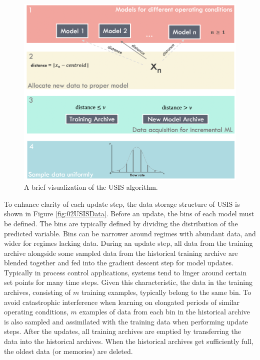 \begin{figure}
    \centering
    \includegraphics[width=\textwidth]{images/suncor/08IncrementalLearning.png}
    \caption{A brief visualization of the USIS algorithm.}
    \label{fig:02USIS}
\end{figure}

To enhance clarity of each update step, the data storage structure of USIS is shown in Figure \ref{fig:02USISData}. Before an update, the bins of each model must be defined.  The bins are typically defined by dividing the distribution of the predicted variable.  Bins can be narrower around regimes with abundant data, and wider for regimes lacking data.  During an update step, all data from the training archive alongside some sampled data from the historical training archive are blended together and fed into the gradient descent step for model updates.  Typically in process control applications, systems tend to linger around certain set points for many time steps.  Given this characteristic, the data in the training archives, consisting of $m$ training examples, typically belong to the same bin.  To avoid catastrophic interference when learning on elongated periods of similar operating conditions, $m$ examples of data from each bin in the historical archive is also sampled and assimilated with the training data when performing update steps. After the updates, all training archives are emptied by transferring the data into the historical archives.  When the historical archives get sufficiently full, the oldest data (or memories) are deleted.

